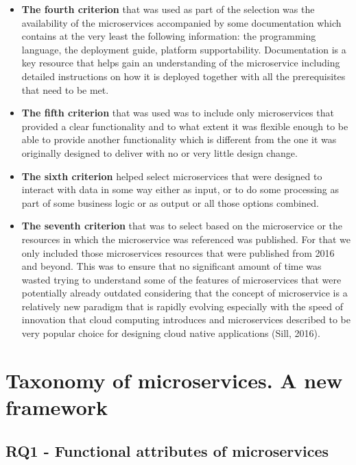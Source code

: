 \documentclass{article}
\begin{document}
\begin{itemize}
\item \textbf{The fourth criterion} that was used as part of the selection was the availability of the microservices accompanied by some documentation which contains at the very least the following information: the programming language, the deployment guide, platform supportability. Documentation is a key resource that helps gain an understanding of the microservice including detailed instructions on how it is deployed together with all the prerequisites that need to be met.

\item \textbf{The fifth criterion} that was used was to include only microservices that provided a clear functionality and to what extent it was flexible enough to be able to provide another functionality which is different from the one it was originally designed to deliver with no or very little design change.


\item \textbf{The sixth criterion} helped select microservices that were designed to interact with data in some way either as input, or to do some processing as part of some business logic or as output or all those options combined.


\item \textbf{The seventh criterion} that was to select based on the microservice or the resources in which the microservice was referenced was published. For that we only included those microservices resources that were published from 2016 and beyond. This was to ensure that no significant amount of time was wasted trying to understand some of the features of microservices that were potentially already outdated considering that the concept of microservice is a relatively new paradigm that is rapidly evolving especially with the speed of innovation that cloud computing introduces and microservices described to be very popular choice for designing cloud native applications (Sill, 2016). 

\end{itemize}

\section{Taxonomy of microservices. A new framework}

\subsection{RQ1 - Functional attributes of microservices}
\end{document}
